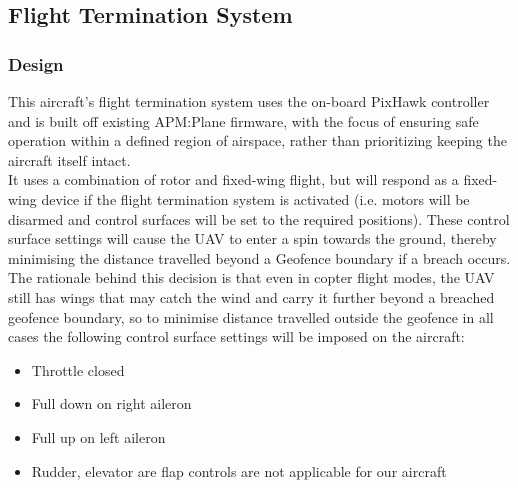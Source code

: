 \subsection{Flight Termination System}
\subsubsection{Design}
This aircraft’s flight termination system uses the on-board PixHawk controller and is built off existing APM:Plane firmware, with the focus of ensuring safe operation within a defined region of airspace, rather than prioritizing keeping the aircraft itself intact.\\

It uses a combination of rotor and fixed-wing flight, but will respond as a fixed-wing device if the flight termination system is activated (i.e. motors will be disarmed and control surfaces will be set to the required positions). These control surface settings will cause the UAV to enter a spin towards the ground, thereby minimising the distance travelled beyond a Geofence boundary if a breach occurs.\\

The rationale behind this decision is that even in copter flight modes, the UAV still has wings that may catch the wind and carry it further beyond a breached geofence boundary, so to minimise distance travelled outside the geofence in all cases the following control surface settings will be imposed on the aircraft:
\begin{itemize}
	\item Throttle closed
	\item Full down on right aileron
	\item Full up on left aileron
	\item Rudder, elevator are flap controls are not applicable for our aircraft
\end{itemize}

